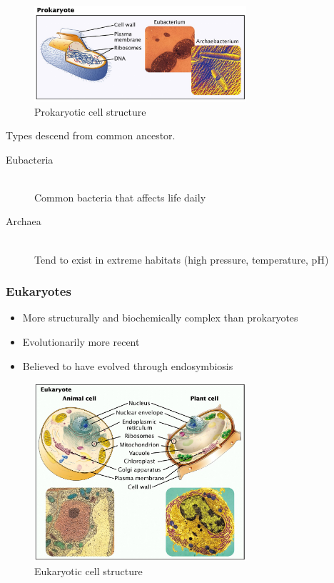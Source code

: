 \documentclass[a4paper]{article}
\begin{document}
\begin{figure}[h!]
  \centering
  \includegraphics[width=0.7\textwidth]{graphics/prokaryotic_cell.eps}
  \caption{Prokaryotic cell structure}
  \label{fig:prokaryotic_cell}
\end{figure}
\FloatBarrier


Types descend from common ancestor.

\begin{description}
  \item[Eubacteria] \hfill \\
    Common bacteria that affects life daily
  \item[Archaea] \hfill \\
    Tend to exist in extreme habitats (high pressure, temperature, pH)
\end{description}

\subsubsection{Eukaryotes}

\begin{itemize}
  \item More structurally and biochemically complex than prokaryotes
  \item Evolutionarily more recent
  \item Believed to have evolved through endosymbiosis
\end{itemize}

\begin{figure}[h!]
  \centering
  \includegraphics[width=0.7\textwidth]{graphics/eukaryotic_cell.eps}
  \caption{Eukaryotic cell structure}
  \label{fig:eukaryotic_cell}
\end{figure}
\FloatBarrier
\end{document}
